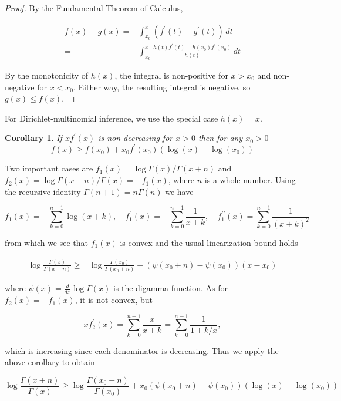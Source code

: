 \documentclass[nofootinbib,amssymb,amsmath]{revtex4}
\newtheorem{corollary}{Corollary}
\begin{document}
\begin{proof}
By the Fundamental Theorem of Calculus,

\begin{align}
f(x) - g(x) =& \int_{x_0}^{x} \left( f^\prime(t) - g^\prime(t) \right) \, dt \\
=&  \int_{x_0}^{x} \frac{ h(t) f^\prime(t) - h(x_0) f^\prime(x_0) } {h(t)} \, dt
\end{align}

By the monotonicity of $h(x)$, the integral is non-positive for $x > x_0$ and non-negative for $x < x_0$.  Either way, the resulting integral is negative, so $g(x) \le f(x)$.
\end{proof}

For Dirichlet-multinomial inference, we use the special case $h(x) = x$.

\begin{corollary} 
If $x f^\prime(x)$ is non-decreasing for $x > 0$ then for any $x_0 > 0$
\begin{equation}
f(x) \ge f(x_0) + x_0 f^\prime(x_0) \left( \log(x) - \log(x_0) \right)
\end{equation}
\end{corollary}


Two important cases are $f_1(x) = \log \Gamma(x) / \Gamma(x + n)$ and $f_2(x) = \log \Gamma(x + n) / \Gamma(x) = -f_1(x)$, where $n$ is a whole number.  Using the recursive identity $\Gamma(n+1) = n \Gamma(n)$ we have

\begin{equation}
f_1(x) = -\sum_{k=0}^{n-1} \log(x + k), \quad f^\prime_1(x) = -\sum_{k=0}^{n-1} \frac{1}{x+k}, \quad f_1^{\prime \prime}(x) = \sum_{k=0}^{n-1} \frac{1}{(x+k)^2}
\end{equation}

from which we see that $f_1(x)$ is convex and the usual linearization bound holds

\begin{align} \label{bound1}
\log \frac{ \Gamma(x) }{ \Gamma(x + n) } \ge & \log \frac{ \Gamma(x_0) }{ \Gamma(x_0 + n) } - \left( \psi(x_0 + n) - \psi(x_0) \right) (x - x_0)
\end{align}

where $\psi(x) = \frac{d}{dx} \log \Gamma(x)$ is the digamma function.  As for $f_2(x) = - f_1(x)$, it is not convex, but

\begin{equation}
x f_2^\prime(x) = \sum_{k=0}^{n-1} \frac{x}{x+k} = \sum_{k=0}^{n-1} \frac{1}{1+k/x},
\end{equation}

which is increasing since each denominator is decreasing.  Thus we apply the above corollary to obtain

\begin{equation} \label{bound2}
\log \frac{ \Gamma(x + n) }{ \Gamma(x) } \ge \log \frac{ \Gamma(x_0 + n) }{ \Gamma(x_0) } + x_0 \left( \psi(x_0 + n) - \psi(x_0) \right)  \left( \log(x) - \log(x_0) \right)
\end{equation}
\end{document}
